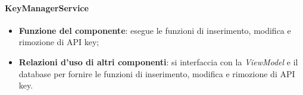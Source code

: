 \paragraph{KeyManagerService}
\begin{itemize}
	\item \textbf{Funzione del componente}: esegue le funzioni di inserimento, modifica e rimozione di API key;
	\item \textbf{Relazioni d’uso di altri componenti}: si interfaccia con la \textit{ViewModel} e il database per fornire le funzioni di inserimento, modifica e rimozione di API key.
\end{itemize}

